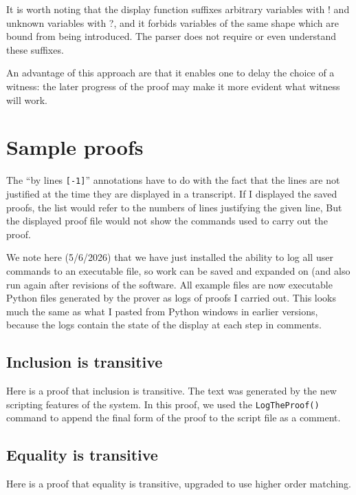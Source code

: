 \documentclass[12pt]{article}
\begin{document}
It is worth noting that the display function suffixes arbitrary variables with ! and unknown variables with ?, and it forbids variables of the same shape which are bound from being introduced.  The parser does not require or even understand these suffixes.

An advantage of this approach are that it enables one to delay the
choice of a witness: the later progress of the proof may make it more
evident what witness will work.


\section{Sample proofs}

The ``by lines {\tt [-1]}''  annotations have to do with the fact that the lines are not justified at the time they are displayed in a transcript.  If I displayed the
saved proofs, the list would refer to the numbers of lines justifying the given line,  But the displayed proof file would not show the commands
used to carry out the proof.

We note here (5/6/2026) that we have just installed the ability to log all user commands to an executable file, so  work can be saved and expanded on
(and also run again after revisions of the software.  All example files are now executable Python files generated by the prover as logs of proofs I carried out.  This looks much the same as what I pasted from Python windows in earlier versions, because the logs contain
the state of the display at each step in comments.

\subsection{Inclusion is transitive}

Here is a proof that inclusion is transitive.  The text was generated by the new scripting features of the system.   In this proof,
we used the {\tt LogTheProof()} command to append the final form of the proof to the script file as a comment.


\subsection{Equality is transitive}

Here is a proof that equality is transitive, upgraded to use higher order matching.


\end{document}

